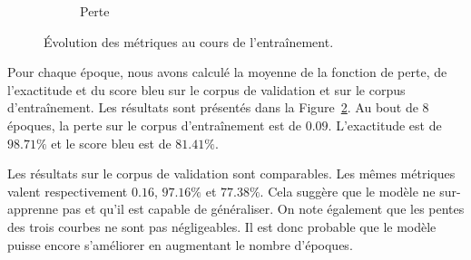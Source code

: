 \begin{figure}[hbt]
\begin{subfigure}{.5\textwidth}
\begin{center}
        \end{center}
        \caption{Perte}
        \label{fig.results.training.loss}
    \end{subfigure}
    \caption{Évolution des métriques au cours de l'entraînement.}
    \label{fig.results.training}
\end{figure}

Pour chaque époque, nous avons calculé la moyenne de la fonction de perte, de l'exactitude et du score \gls{bleu} 
sur le corpus de validation et sur le corpus d'entraînement.
Les résultats sont présentés dans la Figure~\ref{fig.results.training}.
Au bout de 8 époques, la perte sur le corpus d'entraînement est de \(0.09\).
L'exactitude est de \(98.71\%\) et le score \gls{bleu} est de \(81.41\%\).

Les résultats sur le corpus de validation sont comparables.
Les mêmes métriques valent respectivement \(0.16\), \(97.16\%\) et \(77.38\%\).
Cela suggère que le modèle ne sur-apprenne pas et qu'il est capable de généraliser.
On note également que les pentes des trois courbes ne sont pas négligeables.
Il est donc probable que le modèle puisse encore s'améliorer en augmentant le nombre d'époques.